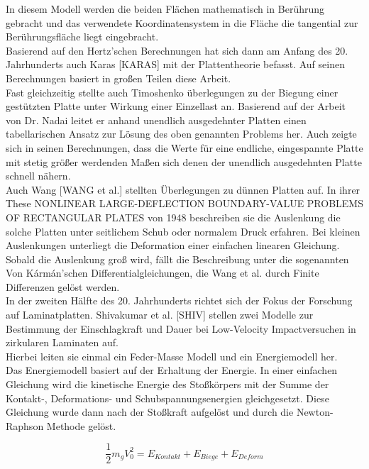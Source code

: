 In diesem Modell werden die beiden Flächen mathematisch in Berührung gebracht und das verwendete Koordinatensystem in die Fläche die tangential zur Berührungsfläche liegt eingebracht. \\


Basierend auf den Hertz'schen Berechnungen hat sich dann am Anfang des 20. Jahrhunderts auch Karas [KARAS] mit der Plattentheorie befasst. Auf seinen Berechnungen basiert in großen Teilen diese Arbeit. \\
Fast gleichzeitig stellte auch Timoshenko überlegungen zu der Biegung einer gestützten Platte unter Wirkung einer Einzellast an. Basierend auf der Arbeit von Dr. Nadai leitet er anhand unendlich ausgedehnter Platten einen tabellarischen Ansatz zur Lösung des oben genannten Problems her. Auch zeigte sich in seinen Berechnungen, dass die Werte für eine endliche, eingespannte Platte mit stetig größer werdenden Maßen sich denen der unendlich ausgedehnten Platte schnell nähern.\\
Auch Wang [WANG et al.] stellten Überlegungen zu dünnen Platten auf. In ihrer These NONLINEAR LARGE-DEFLECTION BOUNDARY-VALUE PROBLEMS OF RECTANGULAR PLATES von 1948 beschreiben sie die Auslenkung die solche Platten unter seitlichem Schub oder normalem Druck erfahren. Bei kleinen Auslenkungen unterliegt die Deformation einer einfachen linearen Gleichung. Sobald die Auslenkung groß wird, fällt die Beschreibung unter die sogenannten Von Kármán'schen Differentialgleichungen, die Wang et al. durch Finite Differenzen gelöst werden.\\
In der zweiten Hälfte des 20. Jahrhunderts richtet sich der Fokus der Forschung auf Laminatplatten. Shivakumar et al. [SHIV] stellen zwei Modelle zur Bestimmung der Einschlagkraft und Dauer bei Low-Velocity Impactversuchen in zirkularen Laminaten auf. \\
Hierbei leiten sie einmal ein Feder-Masse Modell und ein Energiemodell her. \\
Das Energiemodell basiert auf der Erhaltung der Energie. In einer einfachen Gleichung wird die kinetische Energie des Stoßkörpers mit der Summe der Kontakt-, Deformations- und Schubspannungsenergien gleichgesetzt. Diese Gleichung wurde dann nach der Stoßkraft aufgelöst und durch die Newton-Raphson Methode gelöst.

\begin{equation}
	\frac{1}{2} m_{g} V_{0}^{2} = E_{Kontakt} + E_{Biege} + E_{Deform}
\end{equation}

